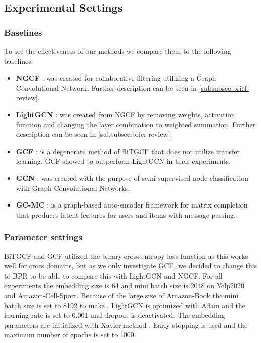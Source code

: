 \subsection{Experimental Settings}

\subsubsection{Baselines}
To see the effectiveness of our methods we compare them to the following baselines:
\begin{itemize}
    \item \textbf{NGCF} \cite{NGCF_2019}: was created for collaborative filtering utilizing a Graph Convolutional Network. Further description can be seen in \autoref{subsubsec:brief-review}.
    \item \textbf{LightGCN} \cite{lightgcn}: was created from NGCF by removing weights, activation function and changing the layer combination to weighted summation. Further description can be seen in \autoref{subsubsec:brief-review}.
    \item \textbf{GCF} \cite{BiTGCF}: is a degenerate method of BiTGCF that does not utilize transfer learning. GCF showed to outperform LightGCN in their experiments.
    \item \textbf{GCN} \cite{GCN}: was created with the purpose of semi-supervised node classification with Graph Convolutional Networks. 
    \item \textbf{GC-MC} \cite{GC_MC}: is a graph-based auto-encoder framework for matrix completion that produces latent features for users and items with message passing.
\end{itemize}

\subsubsection{Parameter settings}
BiTGCF and GCF utilized the binary cross entropy loss function as this works well for cross domains, but as we only investigate GCF, we decided to change this to BPR to be able to compare this with LightGCN and NGCF.
For all experiments the embedding size is 64 and mini batch size is 2048 on Yelp2020 and Amazon-Cell-Sport.
Because of the large size of Amazon-Book the mini batch size is set to 8192 to make .
LightGCN is optimized with Adam \cite{Adam} and the learning rate is set to 0.001 and dropout is deactivated.
The embedding parameters are initialized with Xavier method \cite{Xavier,lightgcn}.
Early stopping is used and the maximum number of epochs is set to 1000.
